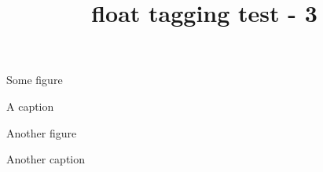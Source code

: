 \documentclass{article}
\title{float tagging test - 3}
\begin{document}

\begin{myfloat}
Some figure
\caption{A caption}
\end{myfloat}

\begin{myfloat}
Another figure
\caption{Another caption}
\end{myfloat}
\end{document}
